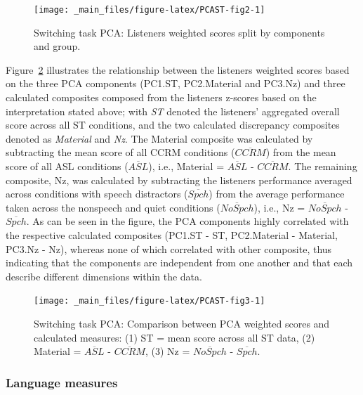 \documentclass[a4paper, twoside]{templates/ociamthesis}
\begin{document}
\begin{figure}

{\centering \texttt{[image: \_main\_files/figure-latex/PCAST-fig2-1]} 

}

\caption{Switching task PCA: Listeners weighted scores split by components and group.}\label{fig:PCAST-fig2}
\end{figure}

Figure~\ref{fig:PCAST-fig3} illustrates the relationship between the listeners weighted scores based on the three PCA components (PC1.ST, PC2.Material and PC3.Nz) and three calculated composites composed from the listeners z-scores based on the interpretation stated above; with \emph{ST} denoted the listeners' aggregated overall score across all ST conditions, and the two calculated discrepancy composites denoted as \emph{Material} and \emph{Nz}. The Material composite was calculated by subtracting the mean score of all CCRM conditions (\(\overline{CCRM}\)) from the mean score of all ASL conditions (\(\overline{ASL}\)), i.e., Material = \(\overline{ASL}\) - \(\overline{CCRM}\). The remaining composite, Nz, was calculated by subtracting the listeners performance averaged across conditions with speech distractors (\(\overline{Spch}\)) from the average performance taken across the nonspeech and quiet conditions (\(\overline{NoSpch}\)), i.e., Nz = \(\overline{NoSpch}\) - \(\overline{Spch}\). As can be seen in the figure, the PCA components highly correlated with the respective calculated composites (PC1.ST - ST, PC2.Material - Material, PC3.Nz - Nz), whereas none of which correlated with other composite, thus indicating that the components are independent from one another and that each describe different dimensions within the data.\\

\begin{figure}

{\centering \texttt{[image: \_main\_files/figure-latex/PCAST-fig3-1]} 

}

\caption{Switching task PCA: Comparison between PCA weighted scores and calculated measures: (1) ST = mean score across all ST data, (2) Material = $\overline{ASL}$ - $\overline{CCRM}$, (3) Nz = $\overline{NoSpch}$ - $\overline{Spch}$.}\label{fig:PCAST-fig3}
\end{figure}

\hypertarget{language-measures}{%
\subsubsection{Language measures}\label{language-measures}}
\end{document}
